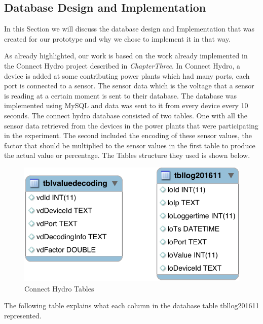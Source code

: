 \subsection{Database Design and Implementation}
\label{subsec:DatabaseDesignandImplementation}
In this Section we will discuss the database design and Implementation that was created for our prototype and why we chose to implement it in that way.

As already highlighted, our work is based on the work already implemented in the Connect Hydro project described in \textit{ChapterThree}. In Connect Hydro, a device is added at some contributing power plants which had many ports, each port is connected to a sensor. The sensor data which is the voltage that a sensor is reading at a certain moment is sent to their database. The database was implemented using MySQL and data was sent to it from every device every 10 seconds. The connect hydro database consisted of two tables. One with all the sensor data retrieved from the devices in the power plants that were participating in the experiment. The second included the encoding of these sensor values, the factor that should be multiplied to the sensor values in the first table to produce the actual value or percentage. The Tables structure they used is shown below.
\begin{figure}[H]
\centering
\includegraphics[scale=0.4]{Images/LoggingDatabase.png}
\caption[Connect Hydro Tables]{Connect Hydro Tables}
\end{figure}
The following table explains what each column in the database table tbllog201611 represented.
